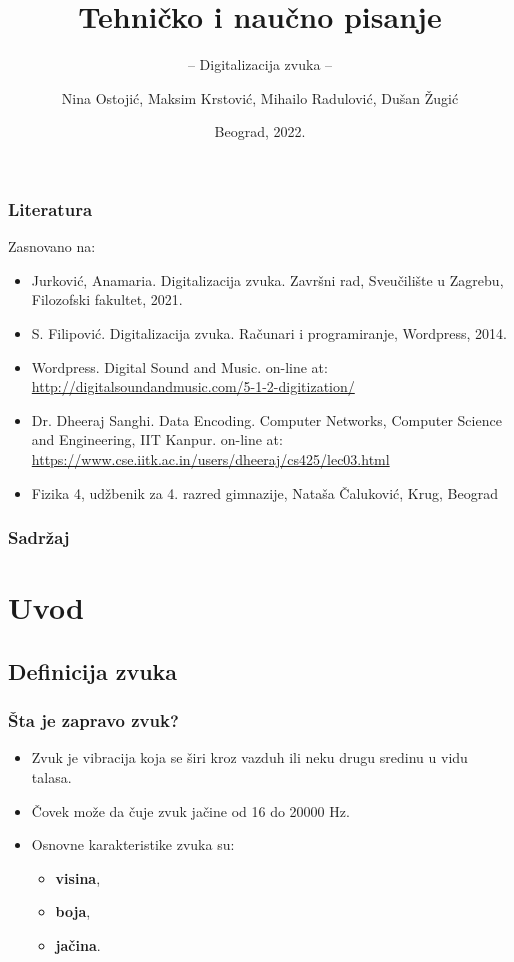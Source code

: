 \documentclass{beamer}
\title{Tehničko i naučno pisanje}
\subtitle{-- Digitalizacija zvuka --}
\author{Nina Ostojić, Maksim Krstović, Mihailo Radulović, Dušan Žugić}
\institute{Matematički fakultet\\Univerzitet u Beogradu}
\date{
	\footnotesize{Beograd, 2022.}	
}
\begin{document}
\begin{frame}
	\thispagestyle{empty}
	\titlepage
\end{frame}

\addtocounter{framenumber}{-1}

\begin{frame}[fragile]\frametitle{Literatura}
	Zasnovano na:
	\begin{itemize}
		\item Jurković, Anamaria. Digitalizacija zvuka. Završni rad, Sveučilište u Zagrebu, Filozofski fakultet, 2021.
		\item S. Filipović. Digitalizacija zvuka. Računari i programiranje, Wordpress, 2014.
		\item Wordpress. Digital Sound and Music. on-line at: \url{http://digitalsoundandmusic.com/5-1-2-digitization/}
		\item Dr. Dheeraj Sanghi. Data Encoding. Computer Networks, Computer Science and Engineering, IIT Kanpur. on-line at: \url{https://www.cse.iitk.ac.in/users/dheeraj/cs425/lec03.html}
		\item Fizika 4, udžbenik za 4. razred gimnazije, Nataša Čaluković, Krug, Beograd
	\end{itemize}
\end{frame}

\begin{frame}
	\frametitle{Sadržaj} 
	\tableofcontents[hidesubsections] 
\end{frame}

\section{Uvod}
\subsection{Definicija zvuka}
\begin{frame}[fragile]\frametitle{Šta je zapravo zvuk?}
	\begin{itemize}	
 
		\item Zvuk je vibracija koja se širi kroz vazduh ili neku drugu sredinu u vidu talasa.
        \item Čovek može da čuje zvuk jačine od 16 do 20000 Hz.
		\item Osnovne karakteristike zvuka su: 
		\begin{itemize}
			\item \textbf{visina}, 
			\item \textbf{boja}, 
			\item \textbf{jačina}.
		\end{itemize}
	\end{itemize}
\end{frame}
\end{document}
